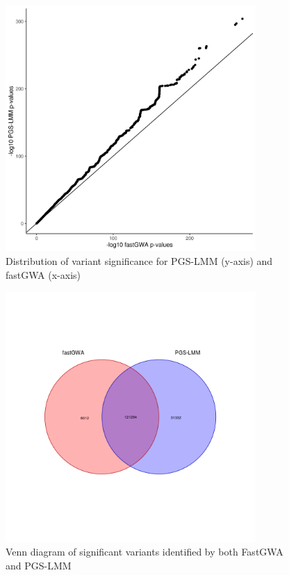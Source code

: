 \documentclass{article}
\begin{document}
\begin{figure}[h!]
  \includegraphics[width=0.85\textwidth]{images/SFig1.png}
  \caption{Distribution of variant significance for PGS-LMM (y-axis) and fastGWA (x-axis)}
\end{figure}

\begin{figure}[h!]
  \includegraphics[width=0.85\textwidth]{images/SFig2.png}
  \caption{Venn diagram of significant variants identified by both FastGWA and PGS-LMM}
\end{figure}
\end{document}
